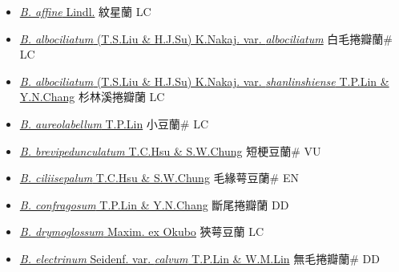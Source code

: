 \begin{itemize}
  \begin{itemize}
        \item[] \href{http://www.theplantlist.org/tpl1.1/search?q=Bulbophyllum+affine}{\textit{B. affine} Lindl.}   紋星蘭 LC
        \item[] \href{http://www.theplantlist.org/tpl1.1/search?q=Bulbophyllum+albociliatum+var.+albociliatum}{\textit{B. albociliatum} (T.S.Liu \& H.J.Su) K.Nakaj. var. \textit{albociliatum}}   白毛捲瓣蘭\# LC
        \item[] \href{http://www.theplantlist.org/tpl1.1/search?q=Bulbophyllum+albociliatum+var.+shanlinshiense}{\textit{B. albociliatum} (T.S.Liu \& H.J.Su) K.Nakaj. var. \textit{shanlinshiense} T.P.Lin \& Y.N.Chang}   杉林溪捲瓣蘭 LC
        \item[] \href{http://www.theplantlist.org/tpl1.1/search?q=Bulbophyllum+aureolabellum}{\textit{B. aureolabellum} T.P.Lin}   小豆蘭\# LC
        \item[] \href{http://www.theplantlist.org/tpl1.1/search?q=Bulbophyllum+brevipedunculatum}{\textit{B. brevipedunculatum} T.C.Hsu \& S.W.Chung}   短梗豆蘭\# VU
        \item[] \href{http://www.theplantlist.org/tpl1.1/search?q=Bulbophyllum+ciliisepalum}{\textit{B. ciliisepalum} T.C.Hsu \& S.W.Chung}   毛緣萼豆蘭\# EN
        \item[] \href{http://www.theplantlist.org/tpl1.1/search?q=Bulbophyllum+confragosum}{\textit{B. confragosum} T.P.Lin \& Y.N.Chang}   斷尾捲瓣蘭 DD
        \item[] \href{http://www.theplantlist.org/tpl1.1/search?q=Bulbophyllum+drymoglossum}{\textit{B. drymoglossum} Maxim. ex Okubo}   狹萼豆蘭 LC
        \item[] \href{http://www.theplantlist.org/tpl1.1/search?q=Bulbophyllum+electrinum+var.+calvum}{\textit{B. electrinum} Seidenf. var. \textit{calvum} T.P.Lin \& W.M.Lin}   無毛捲瓣蘭\# DD

\end{itemize}
\end{itemize}

